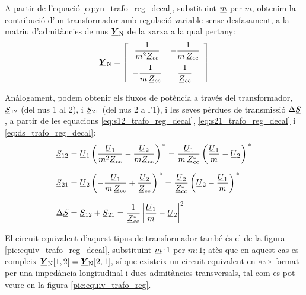 A partir de l'equació  \eqref{eq:yn_trafo_reg_decal}, substituint
$\cmplx{m}$ per $m$, obtenim la contribució d'un transformador amb
regulació variable sense desfasament, a la matriu d'admitàncies de nus
$\mcmplx{Y}\ped{N}$ de la xarxa a la qual pertany:
\begin{equation}
   \mcmplx{Y}\ped{N} = 
   \begin{bmatrix}\begin{array}{cc} 
     \dfrac{1}{m^2 \cmplx{Z}\ped{cc}} & - \dfrac{1}{m \,\cmplx{Z}\ped{cc}} \\[2.5ex]
     - \dfrac{1}{m \,\cmplx{Z}\ped{cc}} & \dfrac{1}{\cmplx{Z}\ped{cc}}
   \end{array}\end{bmatrix}
\end{equation}

Anàlogament, podem obtenir els fluxos de potència a través del
transformador, $\cmplx{S}_{12}$ (del nus 1 al 2), i $\cmplx{S}_{21}$
(del nus 2 a l'1), i les seves pèrdues de transmissió
$\Delta\cmplx{S}$, a partir de les equacions
\eqref{eq:s12_trafo_reg_decal},  \eqref{eq:s21_trafo_reg_decal} i
\eqref{eq:ds_trafo_reg_decal}:  
\begin{align}
   \cmplx{S}_{12} &= \cmplx{U}_1 \left( \frac{\cmplx{U}_1}{m^2 \cmplx{Z}\ped{cc}} - \frac{\cmplx{U}_2}{m \cmplx{Z}\ped{cc}} \right)^{\,*} = \frac{\cmplx{U}_1}{m \,\cmplx{Z}\ped{cc}^*} \left( \frac{\cmplx{U}_1}{m} - \cmplx{U}_2 \right)^{\,*}  \\[1.5ex]
   \cmplx{S}_{21} &= \cmplx{U}_2 \left( - \frac{\cmplx{U}_1}{m \,\cmplx{Z}\ped{cc}} + \frac{\cmplx{U}_2} {\cmplx{Z}\ped{cc}} \right)^{\,*} = \frac{\cmplx{U}_2}{\cmplx{Z}\ped{cc}^*} \left(  \cmplx{U}_2 - \frac{\cmplx{U}_1}{m}  \right)^{\,*} \\[1.5ex]
 \Delta\cmplx{S} &= \cmplx{S}_{12} + \cmplx{S}_{21} = \frac{1}{\cmplx{Z}\ped{cc}^*}  \left|
    \frac{\cmplx{U}_1}{m} - \cmplx{U}_2 \right|^2
\end{align}


El circuit equivalent d'aquest tipus de transformador també és el de la
 figura \vref{pic:equiv_trafo_reg_decal}, substituint $\cmplx{m}\!:\!1$ per $m\!:\!1$;  atès que en aquest cas es compleix $\mcmplx{Y}\ped{N}[1,2] = \mcmplx{Y}\ped{N}[2,1]$, sí que
 existeix un circuit equivalent en «$\pi$» format per una impedància longitudinal i dues admitàncies transversals, tal com es pot veure en la figura  \vref{pic:equiv_trafo_reg}.

